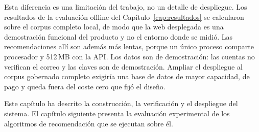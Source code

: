 Esta diferencia es una limitación del trabajo, no un detalle de despliegue. Los resultados de la evaluación offline del
Capítulo~\ref{cap:resultados} se calcularon sobre el corpus completo local, de modo que la web desplegada es una
demostración funcional del producto y no el entorno donde se midió. Las recomendaciones allí son además más lentas, porque
un único proceso comparte procesador y 512\,MB con la API. Los datos son de demostración: las cuentas no verifican el correo y
las claves son de demostración. Ampliar el despliegue al corpus gobernado completo exigiría una base de datos de mayor
capacidad, de pago y queda fuera del coste cero que fijó el diseño.

Este capítulo ha descrito la construcción, la verificación y el despliegue del sistema. El
capítulo siguiente presenta la evaluación experimental de los algoritmos de recomendación que
se ejecutan sobre él.
